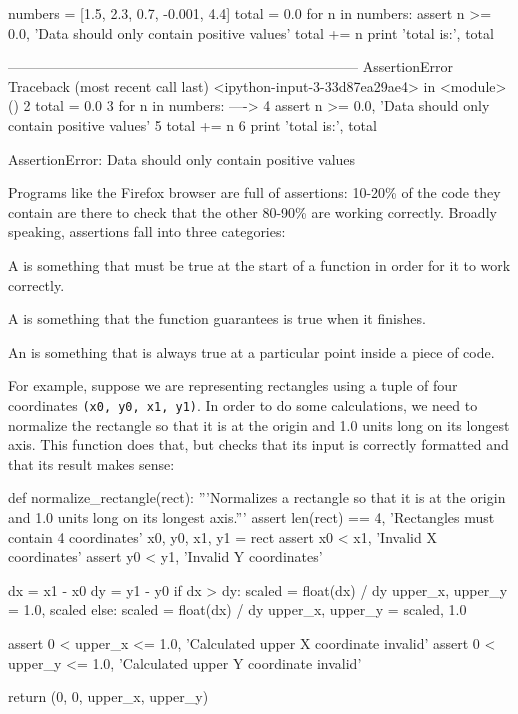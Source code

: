 \documentclass{book}
\begin{document}
\begin{VerbIn}
numbers = [1.5, 2.3, 0.7, -0.001, 4.4]
total = 0.0
for n in numbers:
    assert n >= 0.0, 'Data should only contain positive values'
    total += n
print 'total is:', total
\end{VerbIn}

\begin{VerbErr}
---------------------------------------------------------------------------
AssertionError                            Traceback (most recent call last)
<ipython-input-3-33d87ea29ae4> in <module>()
      2 total = 0.0
      3 for n in numbers:
----> 4     assert n >= 0.0, 'Data should only contain positive values'
      5     total += n
      6 print 'total is:', total

AssertionError: Data should only contain positive values
\end{VerbErr}

Programs like the Firefox browser are full of assertions: 10-20\% of the
code they contain are there to check that the other 80-90\% are working
correctly. Broadly speaking, assertions fall into three categories:

\begin{swcitemize}
\item
  A  is something that must be
  true at the start of a function in order for it to work correctly.
\item
  A  is something that the
  function guarantees is true when it finishes.
\item
  An  is something that is always true
  at a particular point inside a piece of code.
\end{swcitemize}

For example, suppose we are representing rectangles using a tuple of
four coordinates \texttt{(x0, y0, x1, y1)}. In order to do some
calculations, we need to normalize the rectangle so that it is at the
origin and 1.0 units long on its longest axis. This function does that,
but checks that its input is correctly formatted and that its result
makes sense:

\begin{VerbIn}
def normalize_rectangle(rect):
    '''Normalizes a rectangle so that it is at the origin and 1.0 units long on its longest axis.'''
    assert len(rect) == 4, 'Rectangles must contain 4 coordinates'
    x0, y0, x1, y1 = rect
    assert x0 < x1, 'Invalid X coordinates'
    assert y0 < y1, 'Invalid Y coordinates'

    dx = x1 - x0
    dy = y1 - y0
    if dx > dy:
        scaled = float(dx) / dy
        upper_x, upper_y = 1.0, scaled
    else:
        scaled = float(dx) / dy
        upper_x, upper_y = scaled, 1.0

    assert 0 < upper_x <= 1.0, 'Calculated upper X coordinate invalid'
    assert 0 < upper_y <= 1.0, 'Calculated upper Y coordinate invalid'

    return (0, 0, upper_x, upper_y)
\end{VerbIn}
\end{document}
